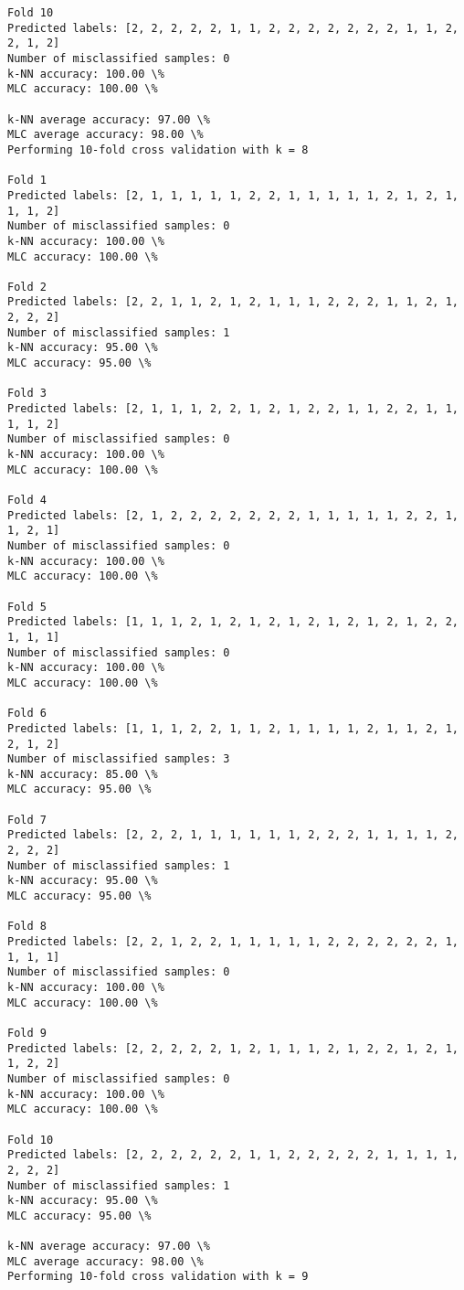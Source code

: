 \documentclass[11pt]{article}
\begin{document}
\begin{Verbatim}[commandchars=\\\{\}]
Fold 10
Predicted labels: [2, 2, 2, 2, 2, 1, 1, 2, 2, 2, 2, 2, 2, 2, 1, 1, 2, 2, 1, 2]
Number of misclassified samples: 0
k-NN accuracy: 100.00 \%
MLC accuracy: 100.00 \%

k-NN average accuracy: 97.00 \%
MLC average accuracy: 98.00 \%
Performing 10-fold cross validation with k = 8

Fold 1
Predicted labels: [2, 1, 1, 1, 1, 1, 2, 2, 1, 1, 1, 1, 1, 2, 1, 2, 1, 1, 1, 2]
Number of misclassified samples: 0
k-NN accuracy: 100.00 \%
MLC accuracy: 100.00 \%

Fold 2
Predicted labels: [2, 2, 1, 1, 2, 1, 2, 1, 1, 1, 2, 2, 2, 1, 1, 2, 1, 2, 2, 2]
Number of misclassified samples: 1
k-NN accuracy: 95.00 \%
MLC accuracy: 95.00 \%

Fold 3
Predicted labels: [2, 1, 1, 1, 2, 2, 1, 2, 1, 2, 2, 1, 1, 2, 2, 1, 1, 1, 1, 2]
Number of misclassified samples: 0
k-NN accuracy: 100.00 \%
MLC accuracy: 100.00 \%

Fold 4
Predicted labels: [2, 1, 2, 2, 2, 2, 2, 2, 2, 1, 1, 1, 1, 1, 2, 2, 1, 1, 2, 1]
Number of misclassified samples: 0
k-NN accuracy: 100.00 \%
MLC accuracy: 100.00 \%

Fold 5
Predicted labels: [1, 1, 1, 2, 1, 2, 1, 2, 1, 2, 1, 2, 1, 2, 1, 2, 2, 1, 1, 1]
Number of misclassified samples: 0
k-NN accuracy: 100.00 \%
MLC accuracy: 100.00 \%

Fold 6
Predicted labels: [1, 1, 1, 2, 2, 1, 1, 2, 1, 1, 1, 1, 2, 1, 1, 2, 1, 2, 1, 2]
Number of misclassified samples: 3
k-NN accuracy: 85.00 \%
MLC accuracy: 95.00 \%

Fold 7
Predicted labels: [2, 2, 2, 1, 1, 1, 1, 1, 1, 2, 2, 2, 1, 1, 1, 1, 2, 2, 2, 2]
Number of misclassified samples: 1
k-NN accuracy: 95.00 \%
MLC accuracy: 95.00 \%

Fold 8
Predicted labels: [2, 2, 1, 2, 2, 1, 1, 1, 1, 1, 2, 2, 2, 2, 2, 2, 1, 1, 1, 1]
Number of misclassified samples: 0
k-NN accuracy: 100.00 \%
MLC accuracy: 100.00 \%

Fold 9
Predicted labels: [2, 2, 2, 2, 2, 1, 2, 1, 1, 1, 2, 1, 2, 2, 1, 2, 1, 1, 2, 2]
Number of misclassified samples: 0
k-NN accuracy: 100.00 \%
MLC accuracy: 100.00 \%

Fold 10
Predicted labels: [2, 2, 2, 2, 2, 2, 1, 1, 2, 2, 2, 2, 2, 1, 1, 1, 1, 2, 2, 2]
Number of misclassified samples: 1
k-NN accuracy: 95.00 \%
MLC accuracy: 95.00 \%

k-NN average accuracy: 97.00 \%
MLC average accuracy: 98.00 \%
Performing 10-fold cross validation with k = 9


\end{Verbatim}
\end{document}
